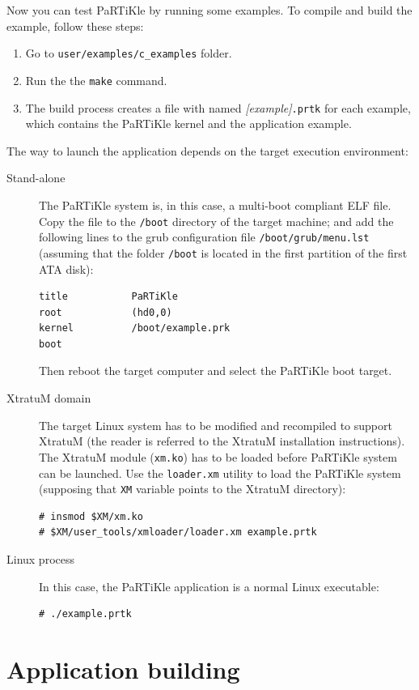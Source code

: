 \documentclass[a4paper,10pt,twoside]{report}
\newcommand{\partikle}[0]{PaRTiKle}
\newcommand{\xtratum}[0]{XtratuM}
\begin{document}
Now you can test \partikle{} by running some examples. To compile and
build the example, follow these steps:
\begin{enumerate}
\item Go to \texttt{user/examples/c\_examples} folder.
\item Run the the \texttt{make} command.
\item The build process creates a file with named
  \textit{[example]}\texttt{.prtk} for each example, which
  contains the \partikle{} kernel and the application example.
\end{enumerate}

\label{config}
The way to launch the application depends on the target execution
environment:
\begin{description}
\item[Stand-alone] The \partikle{} system is, in this case, a multi-boot
  compliant ELF file. Copy the file to the \texttt{/boot} directory of
  the target machine; and add the following lines to the grub
  configuration file \texttt{/boot/grub/menu.lst} (assuming that the
  folder \texttt{/boot} is located in the first partition of the first
  ATA disk):
\begin{verbatim}
title           PaRTiKle
root            (hd0,0)
kernel          /boot/example.prk
boot
\end{verbatim} 
   
  Then reboot the target computer and select the PaRTiKle boot target.
  
\item[\xtratum{} domain] The target Linux system has to be modified and
  recompiled to support \xtratum{} (the reader is referred to the \xtratum{}
  installation instructions). The \xtratum{} module (\texttt{xm.ko}) has
  to be loaded before \partikle{} system can be launched. Use the
  \texttt{loader.xm} utility to load the \partikle{} system (supposing
  that \texttt{XM} variable points to the \xtratum{} directory):
\begin{verbatim}
# insmod $XM/xm.ko
# $XM/user_tools/xmloader/loader.xm example.prtk
\end{verbatim}
\item[Linux process] In this case, the \partikle{} application is a
  normal Linux executable:
\begin{verbatim}
# ./example.prtk
\end{verbatim}
\end{description}


\section{Application building}
\end{document}
